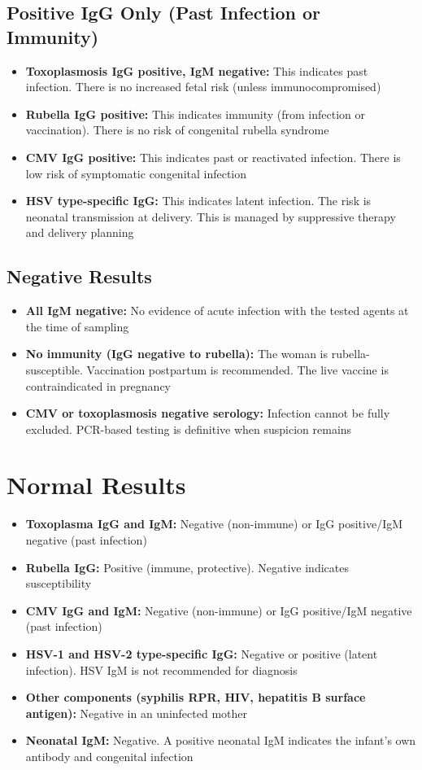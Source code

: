 \subsection*{Positive IgG Only (Past Infection or Immunity)}
\begin{itemize}
  \item \textbf{Toxoplasmosis IgG positive, IgM negative:} This indicates past infection. There is no increased fetal risk (unless immunocompromised)
  \item \textbf{Rubella IgG positive:} This indicates immunity (from infection or vaccination). There is no risk of congenital rubella syndrome
  \item \textbf{CMV IgG positive:} This indicates past or reactivated infection. There is low risk of symptomatic congenital infection
  \item \textbf{HSV type-specific IgG:} This indicates latent infection. The risk is neonatal transmission at delivery. This is managed by suppressive therapy and delivery planning
\end{itemize}

\subsection*{Negative Results}
\begin{itemize}
  \item \textbf{All IgM negative:} No evidence of acute infection with the tested agents at the time of sampling
  \item \textbf{No immunity (IgG negative to rubella):} The woman is rubella-susceptible. Vaccination postpartum is recommended. The live vaccine is contraindicated in pregnancy
  \item \textbf{CMV or toxoplasmosis negative serology:} Infection cannot be fully excluded. PCR-based testing is definitive when suspicion remains
\end{itemize}

\section*{Normal Results}
\begin{itemize}
  \item \textbf{Toxoplasma IgG and IgM:} Negative (non-immune) or IgG positive/IgM negative (past infection)
  \item \textbf{Rubella IgG:} Positive (immune, protective). Negative indicates susceptibility
  \item \textbf{CMV IgG and IgM:} Negative (non-immune) or IgG positive/IgM negative (past infection)
  \item \textbf{HSV-1 and HSV-2 type-specific IgG:} Negative or positive (latent infection). HSV IgM is not recommended for diagnosis
  \item \textbf{Other components (syphilis RPR, HIV, hepatitis B surface antigen):} Negative in an uninfected mother
  \item \textbf{Neonatal IgM:} Negative. A positive neonatal IgM indicates the infant's own antibody and congenital infection
\end{itemize}

